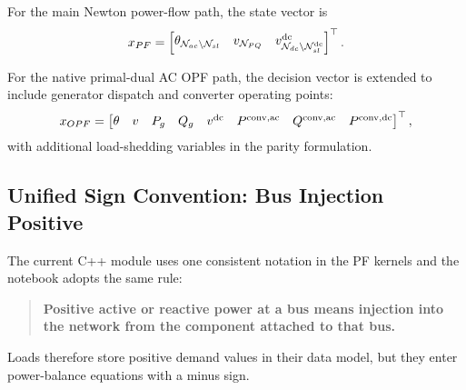 For the main Newton power-flow path, the state vector is
\begin{align}
x_{PF} = \begin{bmatrix} \theta_{\mathcal{N}_{ac}\setminus\mathcal{N}_{sl}} & v_{\mathcal{N}_{PQ}} & v^{\mathrm{dc}}_{\mathcal{N}_{dc}\setminus\mathcal{N}_{sl}^{\mathrm{dc}}} \end{bmatrix}^{\top}.
\end{align}

For the native primal-dual AC OPF path, the decision vector is extended to
include generator dispatch and converter operating points:
\begin{align}
x_{OPF} = \begin{bmatrix}
\theta & v & P_g & Q_g & v^{\mathrm{dc}} & P^{\mathrm{conv,ac}} & Q^{\mathrm{conv,ac}} & P^{\mathrm{conv,dc}}
\end{bmatrix}^{\top},
\end{align}
with additional load-shedding variables in the parity formulation.

\subsection{Unified Sign Convention: Bus Injection Positive}

The current C++ module uses one consistent notation in the PF kernels and the
notebook adopts the same rule:
\begin{quote}
\textbf{Positive active or reactive power at a bus means injection into the network from the component attached to that bus.}
\end{quote}

Loads therefore store positive demand values in their data model, but they enter
power-balance equations with a minus sign.

